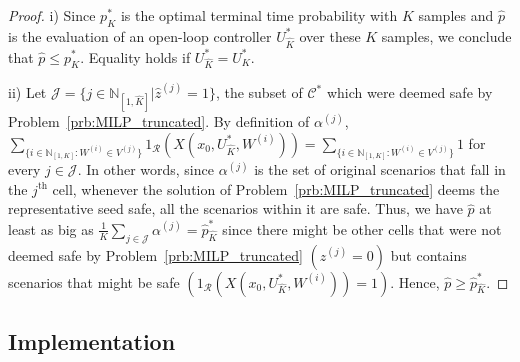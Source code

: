 \documentclass[11pt,letterpaper]{article}
\newcommand{\N}{\mathbb{N}}
\newcommand{\mcR}{\mathcal{R}}
\newcommand{\mcC}{\mathcal{C}}
\begin{document}
	\begin{proof}
        i) Since $p^{*}_{K}$ is the optimal terminal time probability with $K$ samples and $\hat{p}$ is the evaluation of an open-loop controller $U_{\hat{K}}^\ast$ over these $K$ samples, we conclude that $\hat{p}\leq p_{K}^{*}$. Equality holds if $U_{\hat{K}}^{*}=U_{K}^{*}$. 
		
        ii) Let $\mathcal{J}=\{j\in\N_{[1,\hat{K}]}|\hat{z}^{(j)}=1\}$, the subset of $\mcC^\ast$ which were deemed safe by Problem~\ref{prb:MILP_truncated}.
        By definition of $\alpha^{(j)}$, $\sum_{\{i\in \N_{[1,K]}: W^{(i)}\in V^{(j)}\}} 1_{\mcR}\left(X(x_{0},U^{*}_{\hat{K}},W^{(i)})\right) = \sum_{\{i\in \N_{[1,K]}: W^{(i)}\in V^{(j)}\}} 1$ for every $j\in \mathcal{J}$.
        In other words, since $\alpha^{(j)}$ is the set of original scenarios that fall in the $j^\mathrm{th}$ cell, whenever the solution of Problem~\ref{prb:MILP_truncated} deems the representative seed safe, all the scenarios within it are safe.
        Thus, we have $\hat{p}$ at least as big as $\frac{1}{K}\sum_{j\in \mathcal{J}}\alpha^{(j)}=\hat{p}_{\hat{K}}^\ast$ since there might be other cells that were not deemed safe by Problem~\ref{prb:MILP_truncated} $(z^{(j)}=0)$ but contains scenarios that might be safe $\left(1_{\mcR}\left(X(x_{0},U^{*}_{\hat{K}},W^{(i)})\right)=1\right)$. Hence, $\hat{p}\geq \hat{p}_{\hat{K}}^\ast$.
	\end{proof}
	


	
	
	\subsection{Implementation} 
	\label{sec:Implementation}
	
\end{document}
